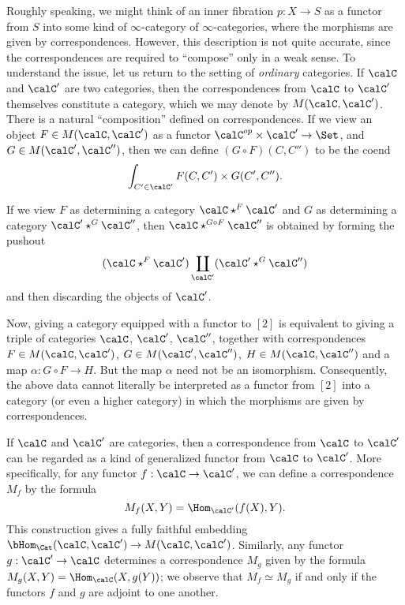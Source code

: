 Roughly speaking, we might think of an inner fibration $p: X \rightarrow
S$ as a functor from $S$ into some kind of
$\infty$-category of $\infty$-categories, where the morphisms are
given by correspondences. However, this description is not quite
accurate, since the correspondences are required to ``compose''
only in a weak sense.
To understand the issue, let us return to the setting of {\em
ordinary} categories. If $\calC$ and $\calC'$ are two categories,
then the correspondences from $\calC$ to $\calC'$ themselves
constitute a category, which we may denote by $M(\calC, \calC')$.
There is a natural ``composition'' defined on correspondences. If
we view an object $F \in M(\calC, \calC')$ as a functor
$\calC^{op} \times \calC' \rightarrow \Set$, and $G \in M(\calC',
\calC'')$, then we can define $(G \circ F)(C,C'')$ to be the coend
$$ \int_{C' \in \calC'} F(C,C') \times G(C',C'').$$

If we view $F$ as determining a 
category $\calC \star^{F} \calC'$ and $G$ as determining a category
$\calC' \star^{G} \calC''$, then $\calC \star^{G \circ F} \calC''$ is obtained
by forming the pushout
$$ ( \calC \star^{F} \calC') \coprod_{ \calC' } ( \calC' \star^{G} \calC'')$$
and then discarding the objects of $\calC'$.

Now, giving a category equipped with a functor to $[2]$ is equivalent to giving a triple of categories $\calC$, $\calC'$,
$\calC''$, together with correspondences $F \in M(\calC,\calC')$,
$G \in M(\calC', \calC'')$, $H \in M(\calC, \calC'')$ and a map $\alpha: G \circ F \rightarrow H$. But the map $\alpha$ need not be an isomorphism. Consequently, the above data cannot
literally be interpreted as a functor from $[2]$ into a
category (or even a higher category) in which the morphisms are
given by correspondences.

If $\calC$ and $\calC'$ are categories, then a correspondence from $\calC$ to $\calC'$ can be regarded as a kind of generalized functor from $\calC$ to $\calC'$. More specifically, for any functor $f: \calC \rightarrow \calC'$, we can define a correspondence $M_f$ by the formula
$$ M_f(X,Y) = \Hom_{\calC'}(f(X),Y).$$
This construction gives a fully faithful embedding $\bHom_{\Cat}(\calC, \calC') \rightarrow M(\calC,\calC')$. Similarly, any functor $g: \calC' \rightarrow \calC$ determines a correspondence $M_{g}$ given by the formula $M_{g}(X,Y) = \Hom_{\calC}(X,g(Y))$; we observe that $M_{f} \simeq M_{g}$ if and only if the functors $f$ and $g$ are adjoint to one another.

